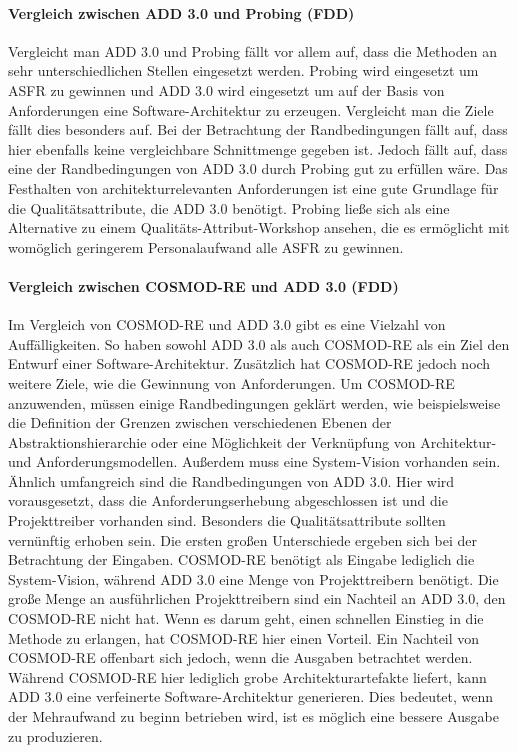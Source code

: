 \paragraph{Vergleich zwischen ADD 3.0 und Probing (FDD)}
Vergleicht man ADD 3.0 und Probing f\"allt vor allem auf, dass die Methoden an sehr unterschiedlichen Stellen eingesetzt werden. Probing wird eingesetzt um ASFR zu gewinnen und ADD 3.0 wird eingesetzt um auf der Basis von Anforderungen eine Software-Architektur zu erzeugen. Vergleicht man die Ziele f\"allt dies besonders auf. Bei der Betrachtung der Randbedingungen f\"allt auf, dass hier ebenfalls keine vergleichbare Schnittmenge gegeben ist. Jedoch f\"allt auf, dass eine der Randbedingungen von ADD 3.0 durch Probing gut zu erf\"ullen w\"are. Das Festhalten von architekturrelevanten Anforderungen ist eine gute Grundlage f\"ur die Qualit\"atsattribute, die ADD 3.0 ben\"otigt. Probing lie\ss{}e sich als eine Alternative zu einem Qualit\"ats-Attribut-Workshop ansehen, die es erm\"oglicht mit wom\"oglich geringerem Personalaufwand alle ASFR zu gewinnen. \\

\paragraph{Vergleich zwischen COSMOD-RE und ADD 3.0 (FDD)}
Im Vergleich von COSMOD-RE und ADD 3.0 gibt es eine Vielzahl von Auff\"alligkeiten. So haben sowohl ADD 3.0 als auch COSMOD-RE als ein Ziel den Entwurf einer Software-Architektur. Zus\"atzlich hat COSMOD-RE jedoch noch weitere Ziele, wie die Gewinnung von Anforderungen. Um COSMOD-RE anzuwenden, m\"ussen einige Randbedingungen gekl\"art werden, wie beispielsweise die Definition der Grenzen zwischen verschiedenen Ebenen der Abstraktionshierarchie oder eine M\"oglichkeit der Verkn\"upfung von Architektur- und Anforderungsmodellen. Au\ss{}erdem muss eine System-Vision vorhanden sein. \"Ahnlich umfangreich sind die Randbedingungen von ADD 3.0. Hier wird vorausgesetzt, dass die Anforderungserhebung abgeschlossen ist und die Projekttreiber vorhanden sind. Besonders die Qualit\"atsattribute sollten vern\"unftig erhoben sein. Die ersten gro\ss{}en Unterschiede ergeben sich bei der Betrachtung der Eingaben. COSMOD-RE ben\"otigt als Eingabe lediglich die System-Vision, w\"ahrend ADD 3.0 eine Menge von Projekttreibern ben\"otigt. Die gro\ss{}e Menge an ausf\"uhrlichen Projekttreibern sind ein Nachteil an ADD 3.0, den COSMOD-RE nicht hat. Wenn es darum geht, einen schnellen Einstieg in die Methode zu erlangen, hat COSMOD-RE hier einen Vorteil. Ein Nachteil von COSMOD-RE offenbart sich jedoch, wenn die Ausgaben betrachtet werden. W\"ahrend COSMOD-RE hier lediglich grobe Architekturartefakte liefert, kann ADD 3.0 eine verfeinerte Software-Architektur generieren. Dies bedeutet, wenn der Mehraufwand zu beginn betrieben wird, ist es m\"oglich eine bessere Ausgabe zu produzieren. \\

